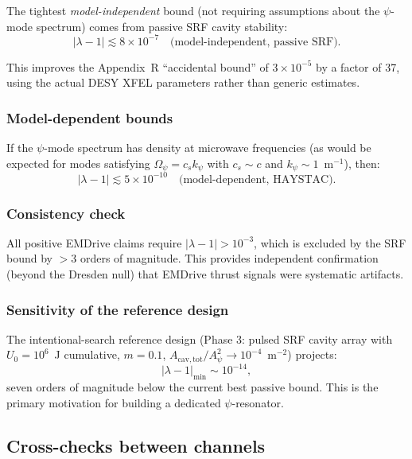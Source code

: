 \documentclass[12pt,aps,prd,twocolumn,superscriptaddress,nofootinbib]{revtex4-2}
\newcommand{\Opsi}{\Omega_\psi}
\newcommand{\Apsi}{A_\psi}
\newcommand{\Acav}{A_{\mathrm{cav,tot}}}
\newcommand{\lmin}{|\lambda-1|_{\mathrm{min}}}
\begin{document}
The tightest \emph{model-independent} bound (not requiring assumptions
about the $\psi$-mode spectrum) comes from passive SRF cavity stability:
\begin{equation}
\boxed{|\lambda-1| \lesssim 8\times10^{-7}
\quad\text{(model-independent, passive SRF)}.}
\label{eq:best_bound}
\end{equation}

This improves the Appendix~R ``accidental bound'' of
$3\times10^{-5}$ by a factor of 37, using the actual DESY XFEL
parameters rather than generic estimates.

\subsubsection{Model-dependent bounds}

If the $\psi$-mode spectrum has density at microwave frequencies
(as would be expected for modes satisfying $\Opsi = c_s k_\psi$
with $c_s \sim c$ and $k_\psi \sim 1$~m$^{-1}$), then:
\begin{equation}
|\lambda-1| \lesssim 5\times10^{-10}
\quad\text{(model-dependent, HAYSTAC)}.
\label{eq:model_dep_bound}
\end{equation}

\subsubsection{Consistency check}

All positive EMDrive claims require $|\lambda-1| > 10^{-3}$,
which is excluded by the SRF bound by $>3$ orders of magnitude.
This provides independent confirmation (beyond the Dresden null)
that EMDrive thrust signals were systematic artifacts.

\subsubsection{Sensitivity of the reference design}

The intentional-search reference design (Phase 3: pulsed SRF
cavity array with $U_0 = 10^6$~J cumulative, $m = 0.1$,
$\Acav/\Apsi^2 \to 10^{-4}$~m$^{-2}$) projects:
\begin{equation}
\lmin \sim 10^{-14},
\label{eq:reach}
\end{equation}
seven orders of magnitude below the current best passive bound.
This is the primary motivation for building a dedicated $\psi$-resonator.

\subsection{Cross-checks between channels}
\end{document}

